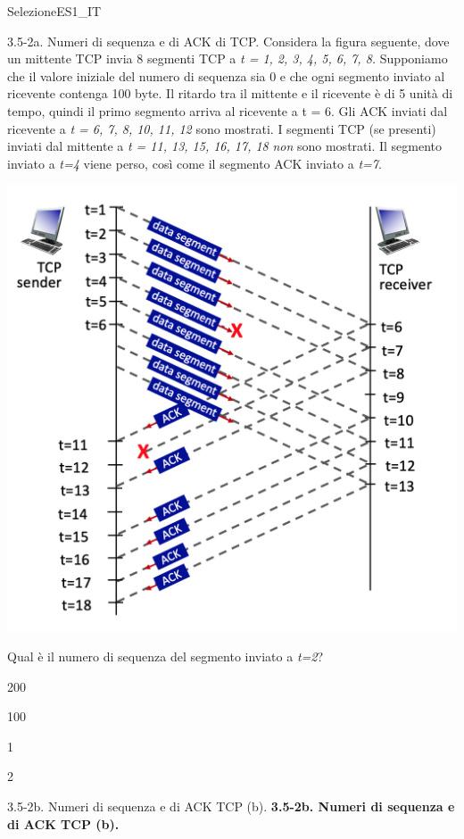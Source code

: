 \documentclass[a4paper]{article}
\begin{document}
\begin{quiz}{SelezioneES1\_IT}
\begin{multi}[points=1,shuffle]{3.5-2a. Numeri di sequenza e di ACK di TCP.}
Considera la figura seguente, dove un mittente TCP invia 8 segmenti TCP a \emph{t = 1, 2, 3, 4, 5, 6, 7, 8.} Supponiamo che il valore iniziale del numero di sequenza sia 0 e che ogni segmento inviato al ricevente contenga 100 byte. Il ritardo tra il mittente e il ricevente è di 5 unità di tempo, quindi il primo segmento arriva al ricevente a t = 6. Gli ACK inviati dal ricevente a \emph{t = 6, 7, 8, 10, 11, 12} sono mostrati. I segmenti TCP (se presenti) inviati dal mittente a \emph{t = 11, 13, 15, 16, 17, 18} \emph{non} sono mostrati. Il segmento inviato a \emph{t=4} viene perso, così come il segmento ACK inviato a \emph{t=7}.
\begin{center}
\includegraphics[width=\linewidth]{figs/tcp_seq_ack_1.jpg}
\end{center}

 Qual è il numero di sequenza del segmento inviato a \emph{t=2}?
\item 200
\item* 100
\item 1
\item 2
\end{multi}

\begin{multi}[points=1,shuffle]{3.5-2b. Numeri di sequenza e di ACK TCP (b).}
\textbf{3.5-2b. Numeri di sequenza e di ACK TCP (b). }


\end{multi}
\end{quiz}
\end{document}
